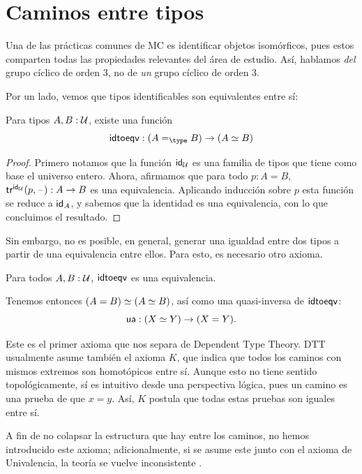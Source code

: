\documentclass[../main.tex]{subfiles}
\begin{document}
\section{Caminos entre tipos} \label{sec-caminos}
Una de las pr\'acticas comunes de MC es identificar objetos isom\'orficos, pues estos comparten todas las propiedades relevantes del \'area de estudio.
As\'i, hablamos \textit{del} grupo c\'iclico de orden 3, no de \textit{un} grupo c\'iclico de orden 3.

Por un lado, vemos que tipos identificables son equivalentes entre s\'i:

\begin{lemma}
  Para tipos $A,B : \UU$, existe una funci\'on
  \[ \idtoeqv : (\id[\type]AB) \to (\eqv A B)\]
\end{lemma}
\begin{proof}
  Primero notamos que la funci\'on $\idfunc[\UU]$ es una familia de tipos que tiene como base el universo entero.
  Ahora, afirmamos que para todo $p:A=B$, $\trfib{\idfunc[\UU]}{p}{\blank}:A \to B$ es una equivalencia. Aplicando inducci\'on sobre $p$ esta funci\'on se reduce a $\idfunc[A]$, y sabemos que la identidad es una equivalencia, con lo que concluimos el resultado.
\end{proof}

Sin embargo, no es posible, en general, generar una igualdad entre dos tipos a partir de una equivalencia entre ellos.
Para esto, es necesario otro axioma.

\begin{axiom}[Univalencia]
  Para todos $A,B:\UU$, $\idtoeqv$ es una equivalencia.
\end{axiom}

Tenemos entonces $\eqv{(A = B)}{(\eqv{A}{B})}$, as\'i como una quasi-inversa de $\idtoeqv$:
\[
  \ua : (\eqv{X}{Y}) \to ({X=Y}).
\]

Este es el primer axioma que nos separa de Dependent Type Theory.
DTT usualmente asume tambi\'en el axioma $K$, que indica que todos los caminos con mismos extremos son homot\'opicos entre s\'i.
Aunque esto no tiene sentido topol\'ogicamente, s\'i es intuitivo desde una perspectiva l\'ogica, pues un camino es una prueba de que $x=y$.
As\'i, $K$ postula que todas estas pruebas son iguales entre s\'i.

A fin de no colapsar la estructura que hay entre los caminos, no hemos introducido este axioma; adicionalmente, si se asume este junto con el axioma de Univalencia, la teor\'ia se vuelve inconsistente \cite[Lema 6.4.1.]{the_univalent_foundations_program_homotopy_2013}.
\end{document}
